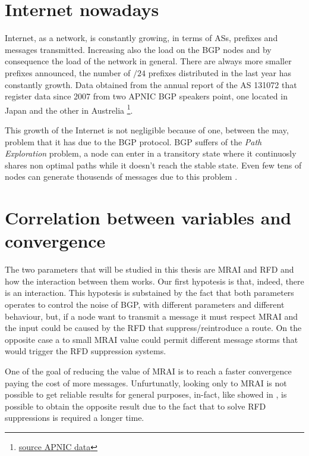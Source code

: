 \section{Internet nowadays}
\label{sec:internet_today}

Internet, as a network, is constantly growing, in terms of \acp{AS}, prefixes
and messages transmitted.
Increasing also the load on the \ac{BGP} nodes and by consequence the load
of the network in general.
There are always more smaller prefixes announced, the number of $/24$ prefixes
distributed in the last year has constantly growth.
Data obtained from the annual report of the \ac{AS} 131072 that register data
since \num{2007} from two APNIC \ac{BGP} speakers point, one located in Japan
and the other in Austrelia \footnote{\href{https://blog.apnic.net/2021/01/05/bgp-in-2020-the-bgp-table/}{source APNIC data}}.

This growth of the Internet is not negligible because of one, between the may, 
problem that it has due to the \ac{BGP} protocol.
\ac{BGP} suffers of the \textit{Path Exploration} problem, a node can enter in 
a transitory state where it continuosly shares non optimal paths while it
doesn't reach the stable state.
Even few tens of nodes can generate thousends of messages due to this problem 
\cite{deshpande2004impact}.

\section{Correlation between variables and convergence}
\label{sec:bgp_correlations}

The two parameters that will be studied in this thesis are \ac{MRAI} and \ac{RFD}
and how the interaction between them works.
Our first hypotesis is that, indeed, there is an interaction.
This hypotesis is substained by the fact that both parameters operates to 
control the noise of \ac{BGP}, with different parameters and different behaviour,
but, if a node want to transmit a message it must respect \ac{MRAI} and the input
could be caused by the \ac{RFD} that suppress/reintroduce a route. 
On the opposite case a to small \ac{MRAI} value could permit different message
storms that would trigger the \ac{RFD} suppression systems.

One of the goal of reducing the value of \ac{MRAI} is to reach a faster convergence
paying the cost of more messages.
Unfurtunatly, looking only to \ac{MRAI} is not possible to get reliable results
for general purposes, in-fact, like showed in , is possible 
to obtain the opposite result due to the fact that to solve \ac{RFD} suppressions
is required a longer time.

